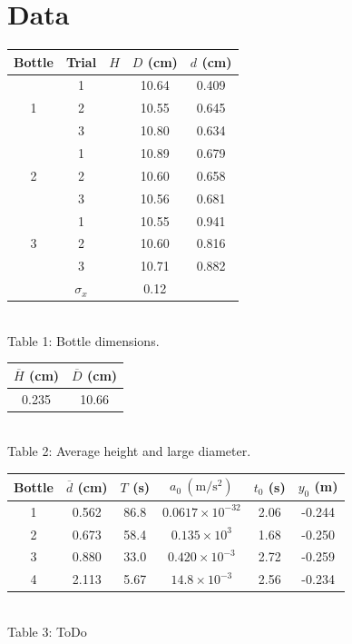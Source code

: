 \documentclass[12pt]{article}
\begin{document}
    \section{Data}
        \begin{center}
            \begin{tabular}{c|c|c|c|c}
                Bottle & Trial & \(H\) & \(D\) (cm)& \(d\) (cm)\\
                \hline
                \multirow{3}{*}{1} & 1 & & 10.64 & 0.409\\
                & 2 &  & 10.55 & 0.645\\
                & 3 &  & 10.80 & 0.634\\
                \hline
                \multirow{3}{*}{2} & 1 & & 10.89 & 0.679\\
                & 2 &  & 10.60 & 0.658\\
                & 3 &  & 10.56 & 0.681\\
                \hline
                \multirow{3}{*}{3} & 1 & & 10.55 & 0.941\\
                & 2 &  & 10.60 & 0.816\\
                & 3 &  & 10.71 & 0.882\\
                \hline
                &\(\sigma_x\) & & 0.12
            \end{tabular}\\[6pt]
            Table 1: Bottle dimensions.\\[12pt]
            \begin{tabular}{c|c}
                \(\overline{H}\) (cm) & \(\overline{D}\) (cm)\\
                \hline
                0.235 & 10.66 
            \end{tabular}\\[6pt]
            Table 2: Average height and large diameter.\\[12pt]
            \begin{tabular}{c|c|c|c|c|c}
                Bottle & \(\overline{d}\) (cm)& \(T\) (s) & \(a_0~(\mathrm{m/s^2})\) & \(t_0\) (s) & \(y_0\) (m)\\
                \hline
                1 & 0.562 & 86.8 & \(0.0617\times10^{-32}\) & 2.06 & -0.244\\
                2 & 0.673 & 58.4 & \(0.135\times10^{3}\) & 1.68 & -0.250\\
                3 & 0.880 & 33.0 & \(0.420\times10^{-3}\) & 2.72 & -0.259\\
                4 & 2.113 & 5.67 & \(14.8\times10^{-3}\) & 2.56 & -0.234
            \end{tabular}\\[6pt]
            Table 3: ToDo
        \end{center}
\end{document}
